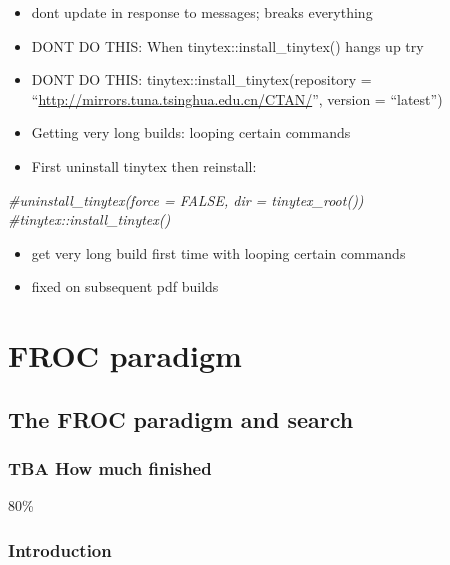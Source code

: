\documentclass[
]{book}
\newenvironment{Shaded}{\begin{snugshade}}{\end{snugshade}}
\newcommand{\CommentTok}[1]{\textcolor[rgb]{0.56,0.35,0.01}{\textit{#1}}}
\providecommand{\tightlist}{%
  \setlength{\itemsep}{0pt}\setlength{\parskip}{0pt}}
\begin{document}
\begin{itemize}
\tightlist
\item
  dont update in response to messages; breaks everything
\item
  DONT DO THIS: When tinytex::install\_tinytex() hangs up try
\item
  DONT DO THIS: tinytex::install\_tinytex(repository = ``\url{http://mirrors.tuna.tsinghua.edu.cn/CTAN/}'', version = ``latest'')
\item
  Getting very long builds: looping certain commands
\item
  First uninstall tinytex then reinstall:
\end{itemize}

\begin{Shaded}
\begin{Highlighting}[]
\CommentTok{#uninstall_tinytex(force = FALSE, dir = tinytex_root())}
\CommentTok{#tinytex::install_tinytex()}
\end{Highlighting}
\end{Shaded}

\begin{itemize}
\tightlist
\item
  get very long build first time with looping certain commands
\item
  fixed on subsequent pdf builds
\end{itemize}

\hypertarget{part-froc-paradigm}{%
\part*{FROC paradigm}\label{part-froc-paradigm}}

\hypertarget{froc-paradigm}{%
\chapter{The FROC paradigm and search}\label{froc-paradigm}}

\hypertarget{froc-paradigm-how-much-finished}{%
\section{TBA How much finished}\label{froc-paradigm-how-much-finished}}

80\%

\hypertarget{froc-paradigm-intro}{%
\section{Introduction}\label{froc-paradigm-intro}}
\end{document}
